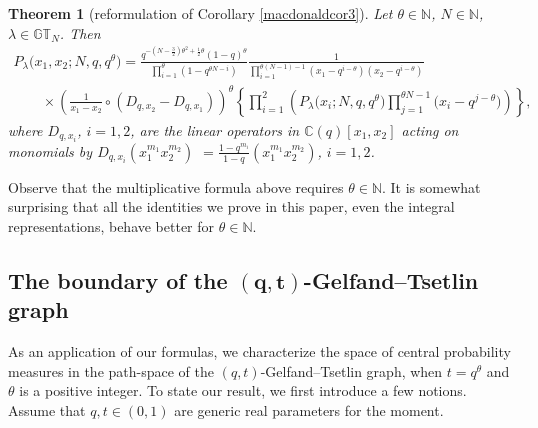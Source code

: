 \documentclass[pdftex]{sigma}
\numberwithin{equation}{section}
\newtheorem{thm}{Theorem}[section]
\newcommand{\C}{\mathbb{C}}
\newcommand{\N}{\mathbb{N}}
\newcommand{\GT}{\mathbb{GT}}
\begin{document}
\begin{thm}[reformulation of Corollary \ref{macdonaldcor3}]
Let $\theta\in\N$, $N\in\N$, $\lambda\in\GT_N$. Then
\begin{gather*}
P_{\lambda}\big(x_1, x_2; N, q, q^{\theta}\big) = \frac{q^{-(N-\frac{3}{2})\theta^2 + \frac{1}{2}\theta} (1 - q)^{\theta} }{\prod\limits_{i=1}^{\theta}{(1 - q^{\theta N - i})}}\frac{1}{\prod\limits_{i=1}^{\theta(N - 1) - 1}{(x_1 - q^{i-\theta})(x_2 - q^{i-\theta})}}\nonumber\\
\qquad{}\times \left( \frac{1}{x_1 - x_2} \circ (D_{q, x_2} - D_{q, x_1}) \right)^{\theta} \left\{ \prod_{i=1}^2{\left( P_{\lambda}\big(x_i; N, q, q^{\theta}\big)\prod_{j=1}^{\theta N-1}{\big(x_i - q^{j-\theta}\big)}\right) }\right\},
\end{gather*}
where $D_{q, x_i}$, $i = 1, 2$, are the linear operators in $\C(q)[x_1, x_2]$ acting on monomials by $D_{q, x_i}(x_1^{m_1}x_2^{m_2})$ $= \frac{1 - q^{m_i}}{1 - q} (x_1^{m_1}x_2^{m_2})$, $i = 1, 2$.
\end{thm}

Observe that the multiplicative formula above requires $\theta\in\N$. It is somewhat surprising that all the identities we prove in this paper, even the integral representations, behave better for $\theta\in\N$.

\subsection[The boundary of the $(q, t)$-Gelfand--Tsetlin graph]{The boundary of the $\boldsymbol{(q, t)}$-Gelfand--Tsetlin graph}

As an application of our formulas, we characterize the space of central probability measures in the path-space of the $(q, t)$-Gelfand--Tsetlin graph, when $t = q^{\theta}$ and $\theta$ is a positive integer.
To state our result, we f\/irst introduce a few notions. Assume that $q, t\in (0, 1)$ are generic real parameters for the moment.
\end{document}
